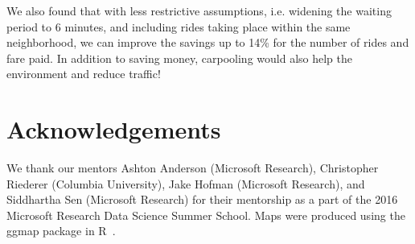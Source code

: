 \documentclass[twocolumn]{article}
\begin{document}
We also found that with less restrictive assumptions, i.e. widening the waiting period to 6 minutes, and including rides taking place within the same neighborhood, we can improve the savings up to 14\% for the number of rides and fare paid. In addition to saving money, carpooling would also help the environment and reduce traffic! 

\section{Acknowledgements}
We thank our mentors Ashton Anderson (Microsoft Research), Christopher Riederer (Columbia University), Jake Hofman (Microsoft Research), and Siddhartha Sen (Microsoft Research) for their mentorship as a part of the 2016 Microsoft Research Data Science Summer School. Maps were produced using the ggmap package in R~\cite{KAHLE:2013}.



\end{document}
